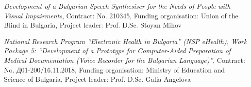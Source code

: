 \documentclass[a4paper,12pt]{article}
\begin{document}
\begin{description}[leftmargin=!,labelwidth=\widthof{\textbf{2021--2023}},align=right]
		\item[\textbf{2021--2022}] \emph{Development of a Bulgarian Speech Synthesiser for the Needs of People with Visual Impairments}, Contract: No. 210345, Funding organisation: Union of the Blind in Bulgaria, Project leader: Prof. D.Sc. Stoyan Mihov
		\item[\textbf{2018--2022}] \emph{National Research Program ``Electronic Health in Bulgaria'' (NSP eHealth), Work Package 5: ``Development of a Prototype for Computer-Aided Preparation of Medical Documentation (Voice Recorder for the Bulgarian Language)''}, Contract: No. Д01-200/16.11.2018, Funding organisation: Ministry of Education and Science of Bulgaria, Project leader: Prof. D.Sc. Galia Angelova
	\end{description}
\end{document}
